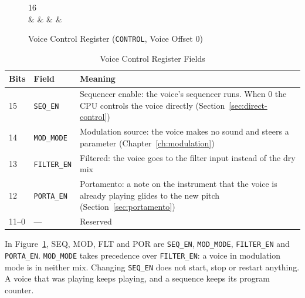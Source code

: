\begin{figure}[H]
	\centering
	\begin{bytefield}[bitwidth=2em]{16}
		 \\
		 &
		 &
		 &
		 &
	\end{bytefield}
	\caption{Voice Control Register (\texttt{CONTROL}, Voice Offset 0)}
	\label{fig:reg-control}
\end{figure}

\begin{table}[H]
	\centering
	\begin{tabular}{llp{8.0cm}}
		\toprule
		\textbf{Bits} & \textbf{Field}      & \textbf{Meaning}                                                                                                              \\
		\midrule
		15            & \texttt{SEQ\_EN}    & Sequencer enable: the voice's sequencer runs. When 0 the CPU controls the voice directly (Section~\ref{sec:direct-control})   \\
		14            & \texttt{MOD\_MODE}  & Modulation source: the voice makes no sound and steers a parameter (Chapter~\ref{ch:modulation})                              \\
		13            & \texttt{FILTER\_EN} & Filtered: the voice goes to the filter input instead of the dry mix                                                           \\
		12            & \texttt{PORTA\_EN}  & Portamento: a note on the instrument that the voice is already playing glides to the new pitch (Section~\ref{sec:portamento}) \\
		11--0         & ---                 & Reserved                                                                                                                      \\
		\bottomrule
	\end{tabular}
	\caption{Voice Control Register Fields}
	\label{tab:reg-control-fields}
\end{table}

In Figure~\ref{fig:reg-control}, SEQ, MOD, FLT and POR are \texttt{SEQ\_EN}, \texttt{MOD\_MODE}, \texttt{FILTER\_EN}
and \texttt{PORTA\_EN}. \texttt{MOD\_MODE} takes precedence over \texttt{FILTER\_EN}: a voice in modulation mode is in
neither mix. Changing \texttt{SEQ\_EN} does not start, stop or restart anything. A voice that was playing keeps
playing, and a sequence keeps its program counter.

